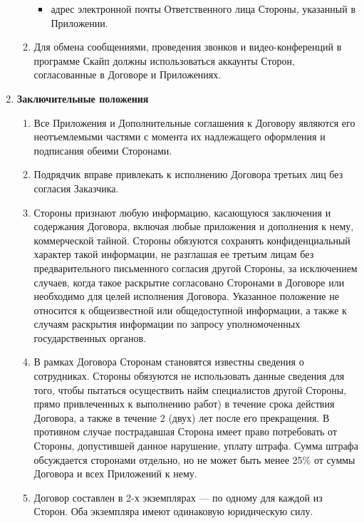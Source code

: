 \documentclass[14pt,a4paper]{article}
\begin{document}
\begin{enumerate}
\begin{enumerate}
\begin{itemize}
			\item адрес электронной почты Ответственного лица Стороны, указанный в Приложении.
		\end{itemize}

		\item Для обмена сообщениями, проведения звонков и видео-конференций в программе Скайп должны использоваться аккаунты Сторон, согласованные в Договоре и Приложениях.
	\end{enumerate}

	\item
	\begin{center}
	\textbf{Заключительные положения}
	\end{center}
	\begin{enumerate}
		\item Все Приложения и Дополнительные соглашения к Договору являются его неотъемлемыми частями с момента их надлежащего оформления и подписания обеими Сторонами.

		\item Подрядчик вправе привлекать к исполнению Договора третьих лиц без согласия Заказчика.
		
		\item Стороны признают любую информацию, касающуюся заключения и содержания Договора, включая любые приложения и дополнения к нему, коммерческой тайной. Стороны обязуются сохранять конфиденциальный характер такой информации, не разглашая ее третьим лицам без предварительного письменного согласия другой Стороны, за исключением случаев, когда такое раскрытие согласовано Сторонами в Договоре или необходимо для целей исполнения Договора. Указанное положение не относится к общеизвестной или общедоступной информации, а также к случаям раскрытия информации по запросу уполномоченных государственных органов.
		
		\item В рамках Договора Сторонам становятся известны сведения о сотрудниках. Стороны обязуются не использовать данные сведения для того, чтобы пытаться осуществить найм специалистов другой Стороны, прямо привлеченных к выполнению работ) в течение срока действия Договора, а также в течение 2 (двух) лет после его прекращения. В противном случае пострадавшая Сторона имеет право потребовать от Стороны, допустившей данное нарушение, уплату штрафа. Сумма штрафа обсуждается сторонами отдельно, но не может быть менее 25\% от суммы Договора и всех Приложений к нему.
		
		\item Договор составлен в 2-х экземплярах — по одному для каждой из Сторон. Оба экземпляра имеют одинаковую юридическую силу.
	\end{enumerate}


\end{enumerate}
\end{document}
